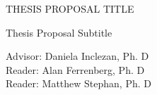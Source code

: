 \documentclass[12pt, oneside]{book2}
\newcommand{\documentTitle}{THESIS PROPOSAL TITLE}
\newcommand{\documentSubtitle}{Thesis Proposal Subtitle}
\newcommand{\documentAuthor}{John Meyer}
\newcommand{\documentYear}{2020}
\newcommand{\thesisAdvisor}{Daniela Inclezan, Ph. D}
\newcommand{\thesisFirstReader}{Alan Ferrenberg, Ph. D}
\newcommand{\thesisSecondReader}{Matthew Stephan, Ph. D}
\theoremstyle{definition}
\begin{document}
\begin{titlepage}
\begin{center}

    \documentTitle

    \vspace{1.5cm}

    \documentSubtitle \\


    \vspace{1.5cm}

    Advisor: \thesisAdvisor\\
    Reader: \thesisFirstReader\\
    Reader: \thesisSecondReader\\



\end{center}
\end{titlepage}
\end{document}
